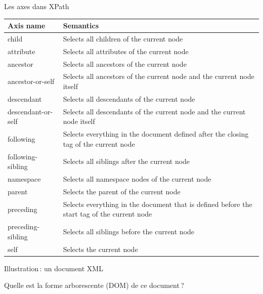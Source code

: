 \begin{frame}{Les axes dans XPath}

\begin{tabular}{| l | p{8cm} |}
\hline
Axis name & Semantics \\
\hline
\hline
child & Selects all children of the current node \\
\hline
attribute & Selects all attributes of the current node \\
\hline
ancestor & Selects all ancestors of the current node \\
\hline
ancestor-or-self & Selects all ancestors of the current node and the current node itself \\
\hline
descendant & Selects all descendants  of the current node \\
\hline
descendant-or-self & Selects all descendants of the current node and the current node itself \\
\hline
following & Selects everything in the document defined after the closing tag of the current node \\
\hline
following-sibling & Selects all siblings after the current node \\
\hline
namespace & Selects all namespace nodes of the current node \\
\hline
parent & Selects the parent of the current node \\
\hline
preceding & Selects everything in the document that is defined before the start tag of the current node \\
\hline
preceding-sibling & Selects all siblings before the current node \\
\hline
self & Selects the current node \\
\hline
\end{tabular}

\end{frame}



\begin{frame}{Illustration\,: un document XML}




\begin{exoblock}
Quelle est la forme arborescente (DOM) de ce document\,?
\end{exoblock}

\end{frame}


